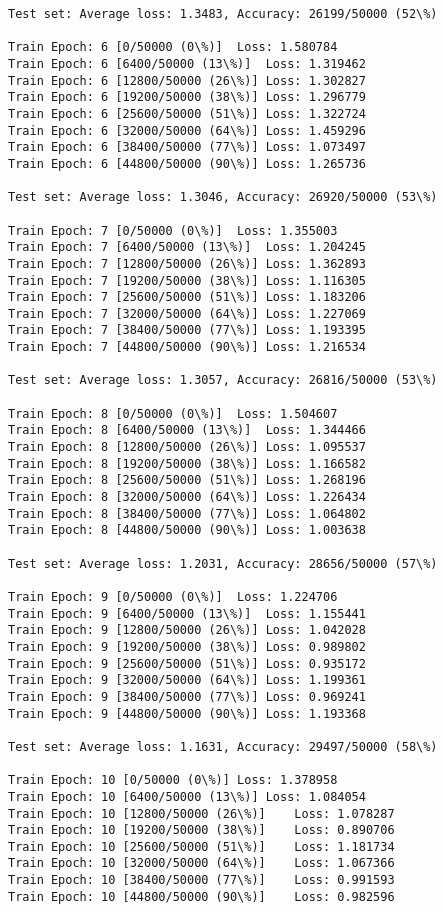 \documentclass[11pt]{article}
\begin{document}
\begin{Verbatim}[commandchars=\\\{\}]
Test set: Average loss: 1.3483, Accuracy: 26199/50000 (52\%)

Train Epoch: 6 [0/50000 (0\%)]	Loss: 1.580784
Train Epoch: 6 [6400/50000 (13\%)]	Loss: 1.319462
Train Epoch: 6 [12800/50000 (26\%)]	Loss: 1.302827
Train Epoch: 6 [19200/50000 (38\%)]	Loss: 1.296779
Train Epoch: 6 [25600/50000 (51\%)]	Loss: 1.322724
Train Epoch: 6 [32000/50000 (64\%)]	Loss: 1.459296
Train Epoch: 6 [38400/50000 (77\%)]	Loss: 1.073497
Train Epoch: 6 [44800/50000 (90\%)]	Loss: 1.265736

Test set: Average loss: 1.3046, Accuracy: 26920/50000 (53\%)

Train Epoch: 7 [0/50000 (0\%)]	Loss: 1.355003
Train Epoch: 7 [6400/50000 (13\%)]	Loss: 1.204245
Train Epoch: 7 [12800/50000 (26\%)]	Loss: 1.362893
Train Epoch: 7 [19200/50000 (38\%)]	Loss: 1.116305
Train Epoch: 7 [25600/50000 (51\%)]	Loss: 1.183206
Train Epoch: 7 [32000/50000 (64\%)]	Loss: 1.227069
Train Epoch: 7 [38400/50000 (77\%)]	Loss: 1.193395
Train Epoch: 7 [44800/50000 (90\%)]	Loss: 1.216534

Test set: Average loss: 1.3057, Accuracy: 26816/50000 (53\%)

Train Epoch: 8 [0/50000 (0\%)]	Loss: 1.504607
Train Epoch: 8 [6400/50000 (13\%)]	Loss: 1.344466
Train Epoch: 8 [12800/50000 (26\%)]	Loss: 1.095537
Train Epoch: 8 [19200/50000 (38\%)]	Loss: 1.166582
Train Epoch: 8 [25600/50000 (51\%)]	Loss: 1.268196
Train Epoch: 8 [32000/50000 (64\%)]	Loss: 1.226434
Train Epoch: 8 [38400/50000 (77\%)]	Loss: 1.064802
Train Epoch: 8 [44800/50000 (90\%)]	Loss: 1.003638

Test set: Average loss: 1.2031, Accuracy: 28656/50000 (57\%)

Train Epoch: 9 [0/50000 (0\%)]	Loss: 1.224706
Train Epoch: 9 [6400/50000 (13\%)]	Loss: 1.155441
Train Epoch: 9 [12800/50000 (26\%)]	Loss: 1.042028
Train Epoch: 9 [19200/50000 (38\%)]	Loss: 0.989802
Train Epoch: 9 [25600/50000 (51\%)]	Loss: 0.935172
Train Epoch: 9 [32000/50000 (64\%)]	Loss: 1.199361
Train Epoch: 9 [38400/50000 (77\%)]	Loss: 0.969241
Train Epoch: 9 [44800/50000 (90\%)]	Loss: 1.193368

Test set: Average loss: 1.1631, Accuracy: 29497/50000 (58\%)

Train Epoch: 10 [0/50000 (0\%)]	Loss: 1.378958
Train Epoch: 10 [6400/50000 (13\%)]	Loss: 1.084054
Train Epoch: 10 [12800/50000 (26\%)]	Loss: 1.078287
Train Epoch: 10 [19200/50000 (38\%)]	Loss: 0.890706
Train Epoch: 10 [25600/50000 (51\%)]	Loss: 1.181734
Train Epoch: 10 [32000/50000 (64\%)]	Loss: 1.067366
Train Epoch: 10 [38400/50000 (77\%)]	Loss: 0.991593
Train Epoch: 10 [44800/50000 (90\%)]	Loss: 0.982596


\end{Verbatim}
\end{document}
